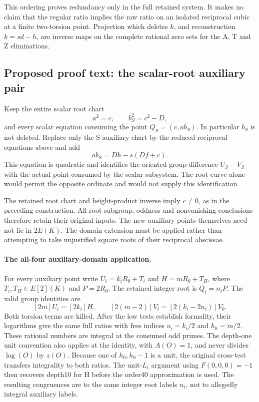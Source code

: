 This ordering proves redundancy only in the full retained system.
It makes no claim that the regular ratio implies the raw ratio on an
isolated reciprocal cubic at a finite two-torsion point. Projection
which deletes $k$, and reconstruction $k=sd-h$, are inverse maps on
the complete rational zero sets for the A, T and Z eliminations.

\subsection{Proposed proof text: the scalar-root auxiliary pair}
\label{outline:r6-expanded-S}
Keep the entire scalar root chart
\[
 a^2=c,\qquad b_S^2=c^2-D,
\]
and every scalar equation consuming the point $Q_S=(c,ab_S)$.
In particular $b_S$ is not deleted. Replace only the S auxiliary chart
by the reduced reciprocal equations above and add
\[
 ab_S=Dh-s(Df+c).
\]
This equation is quadratic and identifies the oriented group difference
$U_S-V_S$ with the actual point consumed by the scalar subsystem.
The root curve alone would permit the opposite ordinate and would not
supply this identification.

The retained root chart and height-product inverse imply $c\ne0$,
as in the preceding construction. All root subgroup, oddness and
nonvanishing conclusions therefore retain their original inputs.
The new auxiliary points themselves need not lie in $2E(K)$.
The domain extension must be applied rather than attempting to take
unjustified square roots of their reciprocal abscissae.

\paragraph{The all-four auxiliary-domain application.}
For every auxiliary point write $U_i=k_iR_0+T_i$ and
$H=mR_0+T_H$, where $T_i,T_H\in E[2](K)$ and $P=2R_0$.
The retained integer root is $Q_i=n_iP$. The valid group identities are
\[
 [2m]U_i=[2k_i]H,\qquad
 [2(m-2)]V_i=[2(k_i-2n_i)]V_0.
\]
Both torsion terms are killed. After the low tests establish formality,
their logarithms give the same full ratios with free indices
$u_i=k_i/2$ and $h_0=m/2$. These rational numbers are integral at the
consumed odd primes. The depth-one unit convention also applies at
the identity, with $A(O)=1$, and never divides $\log(O)$ by $z(O)$.
Because one of $h_0,h_0-1$ is a unit, the original cross-test transfers
integrality to both ratios. The unit-$L_i$ argument using
$F(0,0,0)=-1$ then recovers depth10 for H before the order40
approximation is used. The resulting congruences are to the same
integer root labels $n_i$, not to allegedly integral auxiliary labels.

